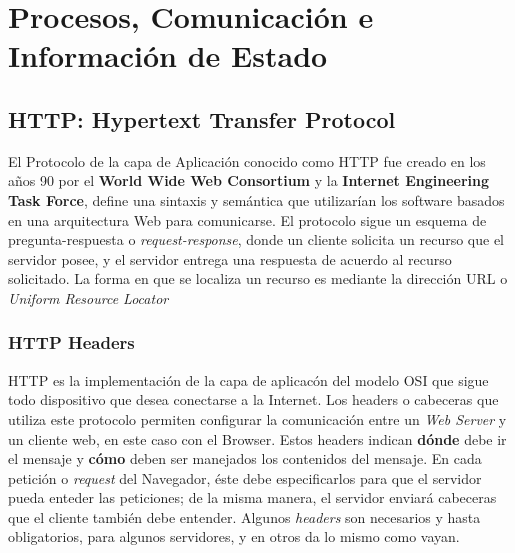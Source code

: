 \section{Procesos, Comunicación e Información de Estado}

    \subsection{HTTP: Hypertext Transfer Protocol}
    \label{chap2:HTTP}
    El Protocolo de la capa de Aplicación conocido como HTTP fue creado en los años 90 por el \textbf{World Wide Web Consortium} \cite{w3c} y la \textbf{Internet Engineering Task Force}, define una sintaxis y semántica que utilizarían los software basados en una arquitectura Web para comunicarse. El protocolo sigue un esquema de pregunta-respuesta o \textit{request-response}, donde un cliente solicita un recurso que el servidor posee, y el servidor entrega una respuesta de acuerdo al recurso solicitado. La forma en que se localiza un recurso es mediante la dirección URL o \textit{Uniform Resource Locator}

        \subsubsection{HTTP Headers}
        \label{chap2:headers}
        HTTP es la implementación de la capa de aplicacón del modelo OSI que sigue todo dispositivo que desea conectarse a la Internet. Los headers o cabeceras que utiliza este protocolo permiten configurar la comunicación entre un \textit{Web Server} y un cliente web, en este caso con el Browser. Estos headers indican \textbf{dónde} debe ir el mensaje y \textbf{cómo} deben ser manejados los contenidos del mensaje. En cada petición o \textit{request} del Navegador, éste debe especificarlos para que el servidor pueda enteder las peticiones; de la misma manera, el servidor enviará cabeceras que el cliente también debe entender. Algunos \textit{headers} son necesarios y hasta obligatorios, para algunos servidores, y en otros da lo mismo como vayan.


